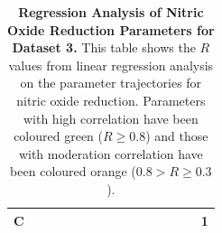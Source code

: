 \begin{table}[p]
{\begin{minipage}{24.4cm}
\begin{tabular}{|c|c|c|c|c|c|c|c|c|c|c|c|c|c|c|}
    \hline
    \cellcolor{dark-gray}C & \cellcolor{light-gray} & \cellcolor{light-gray} & \cellcolor{light-gray} & \cellcolor{light-gray} & \cellcolor{light-gray} & \cellcolor{light-gray} & \cellcolor{light-gray} & \cellcolor{light-gray} & \cellcolor{light-gray} & \cellcolor{light-gray} & \cellcolor{light-gray} & \cellcolor{light-gray} & \cellcolor{light-gray} & \cellcolor{light-gray}1\\
    \hline
  \end{tabular}
  \caption[Regression Analysis of Nitric Oxide Reduction Parameters]{{\bf Regression Analysis of Nitric Oxide Reduction Parameters for Dataset 3.} This table shows the $R$ values from linear regression analysis on the parameter trajectories for nitric oxide reduction. Parameters with high correlation have been coloured green ($R\geq0.8$) and those with moderation correlation have been coloured orange ($0.8>R\geq0.3$).
  \label{tab:noregress1}}
  \end{minipage}
  }
\end{table}
\afterpage{\clearpage}
